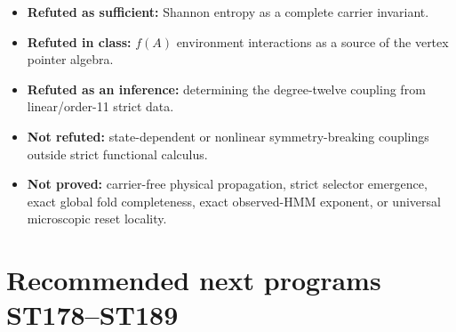 \documentclass[11pt,a4paper]{article}
\begin{document}
\begin{itemize}
\item \textbf{Refuted as sufficient:} Shannon entropy as a complete carrier invariant.
\item \textbf{Refuted in class:} $f(A)$ environment interactions as a source of the vertex pointer algebra.
\item \textbf{Refuted as an inference:} determining the degree-twelve coupling from linear/order-11 strict data.
\item \textbf{Not refuted:} state-dependent or nonlinear symmetry-breaking couplings outside strict functional calculus.
\item \textbf{Not proved:} carrier-free physical propagation, strict selector emergence, exact global fold completeness, exact observed-HMM exponent, or universal microscopic reset locality.
\end{itemize}

\section{Recommended next programs ST178--ST189}
\end{document}
